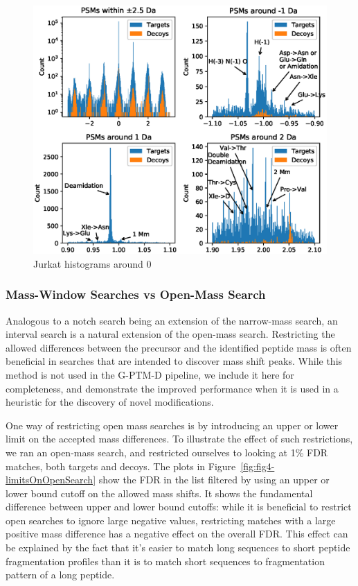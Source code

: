 \documentclass[journal=jprobs,manuscript=article]{achemso}
\begin{document}
\begin{figure}
\caption{Jurkat histograms around 0}
\label{fig:fig3jurkat-1012}
\includegraphics{fig3jurkat-1012}
\end{figure}



\subsubsection{Mass-Window Searches vs Open-Mass Search}

Analogous to a notch search being an extension of the narrow-mass search, an interval search is a natural extension of the open-mass search.
Restricting the allowed differences between the precursor and the identified peptide mass is often beneficial in searches that are intended to discover mass shift peaks.
While this method is not used in the G-PTM-D pipeline, we include it here for completeness, and demonstrate the improved performance when it is used in a heuristic for the discovery of novel modifications.

One way of restricting open mass searches is by introducing an upper or lower limit on the accepted mass differences.
To illustrate the effect of such restrictions, we ran an open-mass search, and restricted ourselves to looking at 1\% FDR matches, both targets and decoys.
The plots in Figure~\ref{fig:fig4-limitsOnOpenSearch} show the FDR in the list filtered by using an upper or lower bound cutoff on the allowed mass shifts.
It shows the fundamental difference between upper and lower bound cutoffs: while it is beneficial to restrict open searches to ignore large negative values, restricting matches with a large positive mass difference has a negative effect on the overall FDR. This effect can be explained by the fact that it's easier to match long sequences to short peptide fragmentation profiles than it is to match short sequences to fragmentation pattern of a long peptide.
\end{document}

